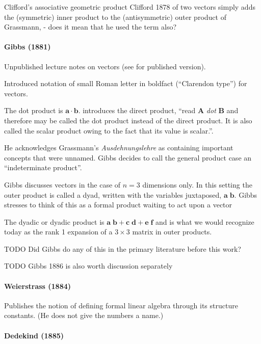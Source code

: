 Clifford’s associative geometric product
Clifford 1878 of two vectors simply adds the
(symmetric) inner product to the (antisymmetric) outer product of Grassmann, - does it mean that he used the term also?


\paragraph{Gibbs (1881)~\cite{Gibbs1881}}

Unpublished lecture notes on vectors (see \cite{Wilson1901} for published version).

Introduced notation of small Roman letter in boldfact (``Clarendon type'') for vectors.

The dot product is $\mathbf a \cdot \mathbf b$.
\cite[p. 55]{Wilson1901} introduces the direct product, ``read \textbf{A} \textit{dot} \textbf{B} and therefore may be called the dot product instead of the direct product. It is also called the scalar product owing to the fact that its value is scalar.''.

He acknowledges Grassmann's \textit{Ausdehnungslehre} as containing important concepts that were unnamed. Gibbs decides to call the general product case an ``indeterminate product''.

Gibbs discusses vectors in the case of $n=3$ dimensions only. In this setting the outer product is called a dyad, written with the variables juxtaposed, $\mathbf{ a \; b }$.
Gibbs stresses to think of this as a formal product waiting to act upon a vector

The dyadic or dyadic product is $\mathbf{ a \; b } + \mathbf{ c \; d } + \mathbf{ e \; f }$ and is what we would recognize today as the rank 1 expansion of a $3 \times 3$ matrix in outer products.

TODO Did Gibbs do any of this in the primary literature before this work?

TODO Gibbs 1886 is also worth discussion separately


\paragraph{Weierstrass (1884)~\cite{Weierstrass1884}}

Publishes the notion of defining formal linear algebra through its structure constants. (He does not give the numbers a name.)



\paragraph{Dedekind (1885)~\cite{Dedekind1885}}

